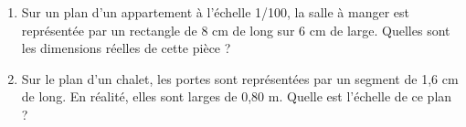 \begin{exercice*}
   \begin{enumerate}
      \item Sur un plan d'un appartement à l’échelle 1/100, la salle à manger est représentée par un rectangle de 8 cm de long sur 6 cm de large. Quelles sont les dimensions réelles de cette pièce ?
      \item Sur le plan d'un chalet, les portes sont représentées par un segment de 1,6 cm de long. En réalité, elles sont larges de 0,80 m. Quelle est l'échelle de ce plan ?
   \end{enumerate}
\end{exercice*}
   